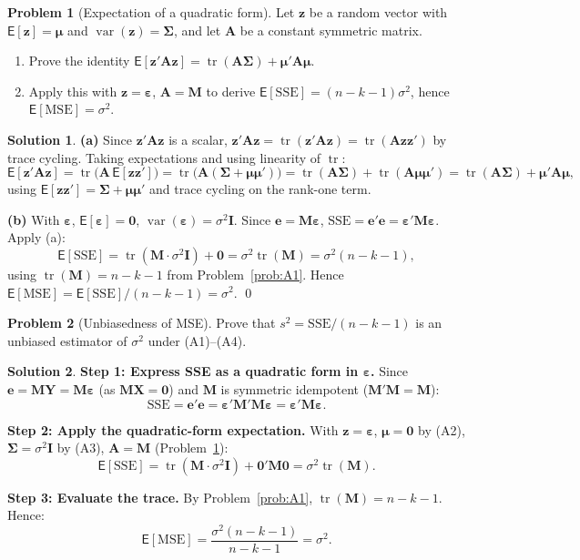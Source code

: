 \documentclass[12pt,a4paper]{article}
\theoremstyle{definition}
\newtheorem{exercise}{Problem}
\newtheorem*{solution*}{Solution}
\newcommand\expc{\mathsf{E}}
\DeclareMathOperator\var{var}
\DeclareMathOperator\tr{tr}
\newcommand{\SSE}{\mathrm{SSE}}
\newcommand{\MSE}{\mathrm{MSE}}
\newcommand{\bX}{\mathbf{X}}
\newcommand{\bY}{\mathbf{Y}}
\newcommand{\be}{\boldsymbol{\varepsilon}}
\newcommand{\bI}{\mathbf{I}}
\newcommand{\bM}{\mathbf{M}}
\newcommand{\bzero}{\mathbf{0}}
\newcommand{\bz}{\mathbf{z}}
\newcommand{\bA}{\mathbf{A}}
\begin{document}
\begin{exercise}[Expectation of a quadratic form]\label{prob:A8}
Let $\bz$ be a random vector with $\expc[\bz] = \boldsymbol\mu$ and $\var(\bz) = \boldsymbol\Sigma$, and let $\bA$ be a constant symmetric matrix.
\begin{enumerate}[label=(\alph*),nosep]
\item Prove the identity $\expc[\bz'\bA\bz] = \tr(\bA\boldsymbol\Sigma) + \boldsymbol\mu'\bA\boldsymbol\mu$.
\item Apply this with $\bz = \be$, $\bA = \bM$ to derive $\expc[\SSE] = (n-k-1)\sigma^2$, hence $\expc[\MSE] = \sigma^2$.
\end{enumerate}
\end{exercise}

\begin{solution*}
\textbf{(a)} Since $\bz'\bA\bz$ is a scalar, $\bz'\bA\bz = \tr(\bz'\bA\bz) = \tr(\bA\bz\bz')$ by trace cycling. Taking expectations and using linearity of $\tr$:
\[
\expc[\bz'\bA\bz] = \tr\bigl(\bA\,\expc[\bz\bz']\bigr) = \tr\bigl(\bA(\boldsymbol\Sigma + \boldsymbol\mu\boldsymbol\mu')\bigr) = \tr(\bA\boldsymbol\Sigma) + \tr(\bA\boldsymbol\mu\boldsymbol\mu') = \tr(\bA\boldsymbol\Sigma) + \boldsymbol\mu'\bA\boldsymbol\mu,
\]
using $\expc[\bz\bz'] = \boldsymbol\Sigma + \boldsymbol\mu\boldsymbol\mu'$ and trace cycling on the rank-one term.

\textbf{(b)} With $\be$, $\expc[\be] = \bzero$, $\var(\be) = \sigma^2\bI$. Since $\mathbf{e} = \bM\be$, $\SSE = \mathbf{e}'\mathbf{e} = \be'\bM\be$. Apply (a):
\[
\expc[\SSE] = \tr(\bM\cdot\sigma^2\bI) + \bzero = \sigma^2\tr(\bM) = \sigma^2(n-k-1),
\]
using $\tr(\bM) = n-k-1$ from Problem~\ref{prob:A1}. Hence $\expc[\MSE] = \expc[\SSE]/(n-k-1) = \sigma^2$. \qed
\end{solution*}

\begin{exercise}[Unbiasedness of MSE]\label{prob:A9}
Prove that $s^2 = \SSE/(n-k-1)$ is an unbiased estimator of $\sigma^2$ under (A1)--(A4).
\end{exercise}

\begin{solution*}
\textbf{Step 1: Express SSE as a quadratic form in $\be$.} Since $\mathbf{e} = \bM\bY = \bM\be$ (as $\bM\bX = \bzero$) and $\bM$ is symmetric idempotent ($\bM'\bM = \bM$):
\[
\SSE = \mathbf{e}'\mathbf{e} = \be'\bM'\bM\be = \be'\bM\be.
\]

\textbf{Step 2: Apply the quadratic-form expectation.} With $\bz = \be$, $\boldsymbol\mu = \bzero$ by (A2), $\boldsymbol\Sigma = \sigma^2\bI$ by (A3), $\bA = \bM$ (Problem~\ref{prob:A8}):
\[
\expc[\SSE] = \tr(\bM \cdot \sigma^2\bI) + \bzero'\bM\bzero = \sigma^2\tr(\bM).
\]

\textbf{Step 3: Evaluate the trace.} By Problem~\ref{prob:A1}, $\tr(\bM) = n-k-1$. Hence:
\[
\expc[\MSE] = \frac{\sigma^2(n-k-1)}{n-k-1} = \sigma^2. \tag*{\qed}
\]
\end{solution*}
\end{document}
